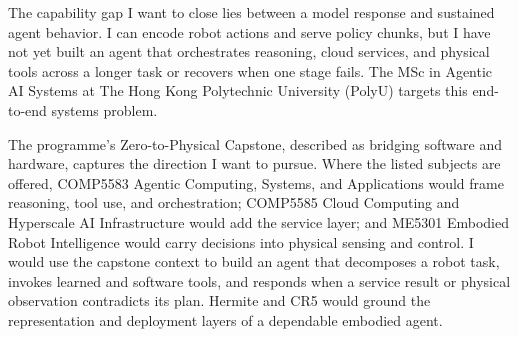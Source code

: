 The capability gap I want to close lies between a model response and sustained agent behavior. I can encode robot actions and serve policy chunks, but I have not yet built an agent that orchestrates reasoning, cloud services, and physical tools across a longer task or recovers when one stage fails. The MSc in Agentic AI Systems at The Hong Kong Polytechnic University (PolyU) targets this end-to-end systems problem.

The programme's Zero-to-Physical Capstone, described as bridging software and hardware, captures the direction I want to pursue. Where the listed subjects are offered, COMP5583 Agentic Computing, Systems, and Applications would frame reasoning, tool use, and orchestration; COMP5585 Cloud Computing and Hyperscale AI Infrastructure would add the service layer; and ME5301 Embodied Robot Intelligence would carry decisions into physical sensing and control. I would use the capstone context to build an agent that decomposes a robot task, invokes learned and software tools, and responds when a service result or physical observation contradicts its plan. Hermite and CR5 would ground the representation and deployment layers of a dependable embodied agent.
